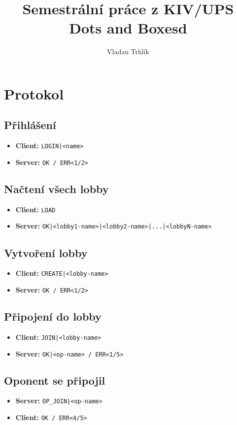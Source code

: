 \documentclass[11pt,a4paper]{article}
\author{Vladan Trhlík}
\title{%
	Semestrální práce z KIV/UPS \\
	\large Dots and Boxesd  \\
}
\begin{document}
\maketitle

\section{Protokol}

\subsection*{Přihlášení}
\begin{itemize}
	\item \textbf{Client:} \texttt{LOGIN|<name>}
	\item \textbf{Server:} \texttt{OK / ERR<1/2>}
\end{itemize}

\subsection*{Načtení všech lobby}
\begin{itemize}
	\item \textbf{Client:} \texttt{LOAD}
	\item \textbf{Server:} \texttt{OK|<lobby1-name>|<lobby2-name>|...|<lobbyN-name>}
\end{itemize}

\subsection*{Vytvoření lobby}
\begin{itemize}
	\item \textbf{Client:} \texttt{CREATE|<lobby-name>}
	\item \textbf{Server:} \texttt{OK / ERR<1/2>}
\end{itemize}

\subsection*{Připojení do lobby}
\begin{itemize}
	\item \textbf{Client:} \texttt{JOIN|<lobby-name>}
	\item \textbf{Server:} \texttt{OK|<op-name> / ERR<1/5>}
\end{itemize}

\subsection*{Oponent se připojil}
\begin{itemize}
	\item \textbf{Server:} \texttt{OP\_JOIN|<op-name>}
	\item \textbf{Client:} \texttt{OK / ERR<4/5>}
\end{itemize}
\end{document}
